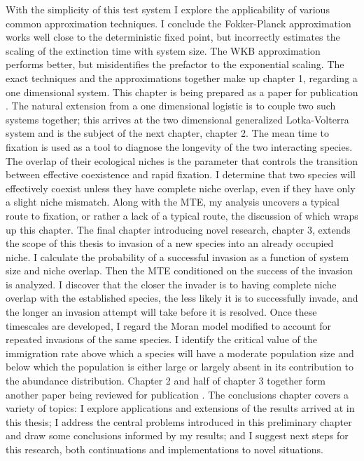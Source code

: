 With the simplicity of this test system I explore the applicability of various common approximation techniques. 
I conclude the Fokker-Planck approximation works well close to the deterministic fixed point, but incorrectly estimates the scaling of the extinction time with system size. The WKB approximation performs better, but misidentifies the prefactor to the exponential scaling. %
The exact techniques and the approximations together make up chapter 1, regarding a one dimensional system. %
This chapter is being prepared as a paper for publication \cite{Badali2018a}. 
The natural extension from a one dimensional logistic is to couple two such systems together; this arrives at the two dimensional generalized Lotka-Volterra system and is the subject of the next chapter, chapter 2. %
The mean time to fixation is used as a tool to diagnose the longevity of the two interacting species. 
The overlap of their ecological niches is the parameter that controls the transition between effective coexistence and rapid fixation. 
I determine that two species will effectively coexist unless they have complete niche overlap, even if they have only a slight niche mismatch. %
Along with the MTE, my analysis uncovers a typical route to fixation, or rather a lack of a typical route, the discussion of which wraps up this chapter. %
The final chapter introducing novel research, chapter 3, extends the scope of this thesis to invasion of a new species into an already occupied niche. %
I calculate the probability of a successful invasion as a function of system size and niche overlap. 
Then the MTE conditioned on the success of the invasion is analyzed. 
I discover that the closer the invader is to having complete niche overlap with the established species, the less likely it is to successfully invade, and the longer an invasion attempt will take before it is resolved. %
Once these timescales are developed, I regard the Moran model modified to account for repeated invasions of the same species. 
I identify the critical value of the immigration rate above which a species will have a moderate population size and below which the population is either large or largely absent in its contribution to the abundance distribution. %
Chapter 2 and half of chapter 3 together form another paper being reviewed for publication \cite{Badali2018}. %
The conclusions chapter covers a variety of topics: I explore applications and extensions of the results arrived at in this thesis; I address the central problems introduced in this preliminary chapter and draw some conclusions informed by my results; and I suggest next steps for this research, both continuations and implementations to novel situations. 
\fi

